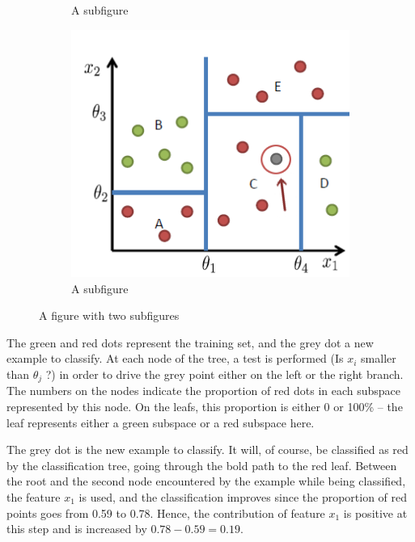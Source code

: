 \documentclass[a4paper,11pt]{kth-mag}
\begin{document}
\begin{figure}[h!]
\begin{subfigure}{.55\textwidth}
  \caption{A subfigure}
  \label{fig:sub1}
\end{subfigure}%
\begin{subfigure}{0.45\textwidth}
  \centering
  \includegraphics[width=1.0\linewidth]{img/decisiontree.png}
  \caption{A subfigure}
  \label{fig:sub2}
\end{subfigure}
\caption{A figure with two subfigures}
\label{fig:test}
\end{figure}

The green and red dots represent the training set, and the grey dot a new example to classify. At each node of the tree, a test is performed (Is $x_i$ smaller than $\theta_j$ ?) in order to drive the grey point either on the left or the right branch. The numbers on the nodes indicate the proportion of red dots in each subspace represented by this node. On the leafs, this proportion is either 0 or 100\% -- the leaf represents either a green subspace or a red subspace here.

The grey dot is the new example to classify. It will, of course, be classified as red by the classification tree, going through the bold path to the red leaf. 
Between the root and the second node encountered by the example while being classified, the feature $x_1$ is used, and the classification improves since the proportion of red points goes from 0.59 to 0.78. Hence, the contribution of feature $x_1$ is positive at this step and is increased by $0.78 - 0.59 = 0.19$.
\end{document}
